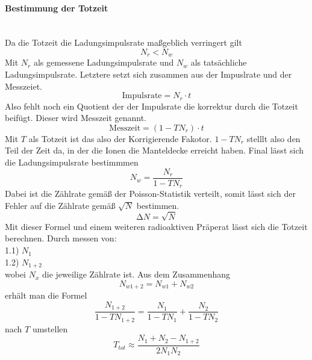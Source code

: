\paragraph{Bestimmung der Totzeit} 
\label{para:Totzeit}
\mbox{} \\
Da die Totzeit die Ladungsimpulsrate maßgeblich verringert gilt
\begin{equation*}
\label{ref:totzeitverhaeltnis}
N_r < N_w
\end{equation*}
Mit $N_r$ als gemessene Ladungsimpulsrate und $N_w$ als tatsächliche Ladungsimpulsrate. 
Letztere setzt sich zusammen aus der Impuslrate und der Messzeiet.
\begin{equation*}
\text{Impulsrate} = N_r \cdot t
\end{equation*} 
Also fehlt noch ein Quotient der der Impulsrate die korrektur durch die Totzeit beifügt. Dieser wird Messzeit genannt.
\begin{equation*}
\text{Messzeit} = (1-TN_r) \cdot t
\end{equation*}
Mit $T$ als Totzeit ist das also der Korrigierende Fakotor. $1-TN_r$ stelllt also den Teil der Zeit da, in der die Ionen die Manteldecke erreicht haben.
Final lässt sich die Ladungsimpulsrate bestimmmen 
\begin{equation}
\label{ref:Ladungsimpulsrate}
N_w = \frac{N_r}{1-TN_r}
\end{equation}
Dabei ist die Zählrate gemäß der Poisson-Statistik verteilt, somit lässt sich der Fehler auf die Zählrate gemäß $\sqrt{N}$
bestimmen.
\begin{equation}
\label{eqn:fehlerzählrate} %
\increment N = \sqrt{N}
\end{equation}
Mit dieser Formel und einem weiteren radioaktiven Präperat  lässt sich die Totzeit berechnen. 
Durch messen von:\\
1.1)  $N_1$  \\
1.2) $N_{1+2}$\\
wobei $N_x$ die jeweilige Zählrate ist.
Aus dem Zusammenhang 
\begin{equation*}
N_{w1+2} = N_{w1} + N_{w2}
\end{equation*}
erhält man die Formel
\begin{equation*}
\frac{N_{1+2}}{1-TN_{1+2}}=\frac{N_1}{1-TN_1} + \frac{N_2}{1-TN_2}
\end{equation*}
nach $T$ umstellen
\begin{equation}
\label{eqn:totzeit}
T_{tot} \approx \frac{N_1+N_2-N_{1+2}}{2N_1N_2}
\end{equation}


